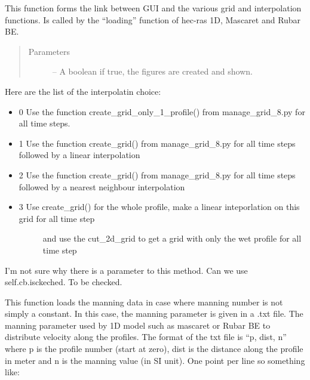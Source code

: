 \documentclass[letterpaper,10pt,english]{sphinxmanual}
\begin{document}
\begin{fulllineitems}
\begin{fulllineitems}
\label{\detokenize{index:src_GUI.hydro_GUI_2.SubHydroW.grid_and_interpo}}
This function forms the link between GUI and the various grid and interpolation functions. Is called by
the ``loading'' function of hec-ras 1D, Mascaret and Rubar BE.
\begin{quote}\begin{description}
\item[{Parameters}] \leavevmode
{} -- A boolean if true, the figures are created and shown.

\end{description}\end{quote}


Here are the list of the interpolatin choice:
\begin{itemize}
\item {} 
0 Use the function create\_grid\_only\_1\_profile() from manage\_grid\_8.py for all time steps.

\item {} 
1 Use the function create\_grid() from manage\_grid\_8.py for all time steps followed by a linear interpolation

\item {} 
2 Use the function create\_grid() from manage\_grid\_8.py for all time steps followed by a nearest neighbour interpolation

\item {} \begin{description}
\item[{3 Use create\_grid() for the whole profile, make a linear inteporlation on this grid for all time step}] \leavevmode
and use the cut\_2d\_grid to get a grid with only the wet profile for all time step

\end{description}

\end{itemize}

I'm not sure why there is a parameter to this method. Can we use self.cb.isckeched. To be checked.

\end{fulllineitems}


\begin{fulllineitems}
\label{\detokenize{index:src_GUI.hydro_GUI_2.SubHydroW.load_manning_text}}
This function loads the manning data in case where manning number is not simply a constant. In this case, the manning
parameter is given in a .txt file.
The manning parameter used by 1D model such as mascaret or Rubar BE to distribute velocity along the profiles.
The format of the txt file is ``p, dist, n'' where  p is the profile number (start at zero), dist is the distance
along the profile in meter and n is the manning value (in SI unit). One point per line so something like:


\end{fulllineitems}
\end{fulllineitems}
\end{document}
